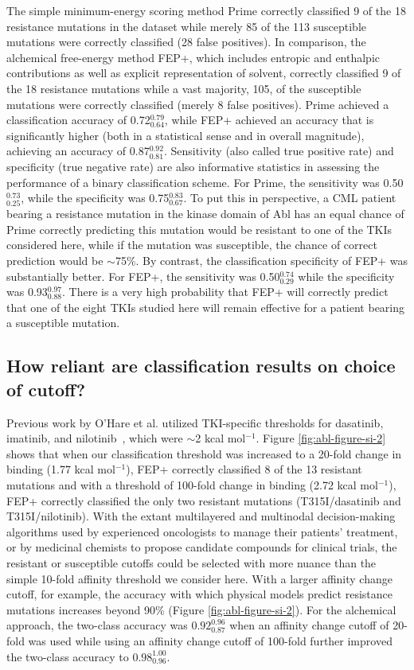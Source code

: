 \documentclass[phd,tocprelim]{cornell}
\begin{document}
The simple minimum-energy scoring method Prime correctly classified 9 of the 18 resistance mutations in the dataset while merely 85 of the 113 susceptible mutations were correctly classified (28 false positives).
In comparison, the alchemical free-energy method FEP+, which includes entropic and enthalpic contributions as well as explicit representation of solvent, correctly classified 9 of the 18 resistance mutations while a vast majority, 105, of the susceptible mutations were correctly classified (merely 8 false positives).
Prime achieved a classification accuracy of 0.72$^{0.79}_{0.64}$, while FEP+ achieved an accuracy that is significantly higher (both in a statistical sense and in overall magnitude), achieving an accuracy of 0.87$^{0.92}_{0.81}$.
Sensitivity (also called true positive rate) and specificity (true negative rate) are also informative statistics in assessing the performance of a binary classification scheme.
For Prime, the sensitivity was 0.50$^{0.73}_{0.25}$, while the specificity was 0.75$^{0.83}_{0.67}$.
To put this in perspective, a CML patient bearing a resistance mutation in the kinase domain of Abl has an equal chance of Prime correctly predicting this mutation would be resistant to one of the TKIs considered here, while if the mutation was susceptible, the chance of correct prediction would be $\sim$75\%.
By contrast, the classification specificity of FEP+ was substantially better.
For FEP+, the sensitivity was 0.50$^{0.74}_{0.29}$ while the specificity was 0.93$^{0.97}_{0.88}$.
There is a very high probability that FEP+ will correctly predict that one of the eight TKIs studied here will remain effective for a patient bearing a susceptible mutation. 

\subsection{How reliant are classification results on choice of cutoff?}
Previous work by O'Hare et al. utilized TKI-specific thresholds for dasatinib, imatinib, and nilotinib~\citep{OHare:Clin.CancerRes.:2005}, which were $\sim$2 kcal mol$^{-1}$. Figure \ref{fig:abl-figure-si-2} shows that when our classification threshold was increased to a 20-fold change in binding (1.77 kcal mol$^{-1}$), FEP+ correctly classified 8 of the 13 resistant mutations and with a threshold of 100-fold change in binding (2.72 kcal mol$^{-1}$), FEP+ correctly classified the only two resistant mutations (T315I/dasatinib and T315I/nilotinib).
With the extant multilayered and multinodal decision-making algorithms used by experienced oncologists to manage their patients' treatment, or by medicinal chemists to propose candidate compounds for clinical trials, the resistant or susceptible cutoffs could be selected with more nuance than the simple 10-fold affinity threshold we consider here.
With a larger affinity change cutoff, for example, the accuracy with which physical models predict resistance mutations increases beyond 90\% (Figure \ref{fig:abl-figure-si-2}).
For the alchemical approach, the two-class accuracy was $0.92^{0.96}_{0.87}$ when an affinity change cutoff of 20-fold was used while using an affinity change cutoff of 100-fold further improved the two-class accuracy to $0.98^{1.00}_{0.96}$.
\end{document}
